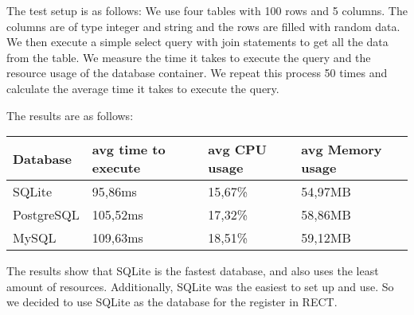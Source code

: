 The test setup is as follows: We use four tables with 100 rows and 5 columns. The columns are of type integer and string and the rows are filled with random data. We then 
execute a simple select query with join statements to get all the data from the table. We measure the time it takes to execute the query and the resource usage of the database 
container. We repeat this process 50 times and calculate the average time it takes to execute the query.\newline

The results are as follows:
\begin{center}
    \begin{tabular}{ | m{3cm} | m{4cm}| m{4cm} | m{4cm} | } 
      \hline
      Database & avg time to execute & avg CPU usage & avg Memory usage \\ 
      \hline
      SQLite & 95,86ms & 15,67\% & 54,97MB \\ 
      \hline
      PostgreSQL & 105,52ms & 17,32\% & 58,86MB \\ 
      \hline
      MySQL & 109,63ms & 18,51\% & 59,12MB \\
      \hline
    \end{tabular}
\end{center}

The results show that SQLite is the fastest database, and also uses the least amount of resources. Additionally, SQLite was the easiest to set up and use. So we decided to use
SQLite as the database for the register in RECT.

\filbreak
